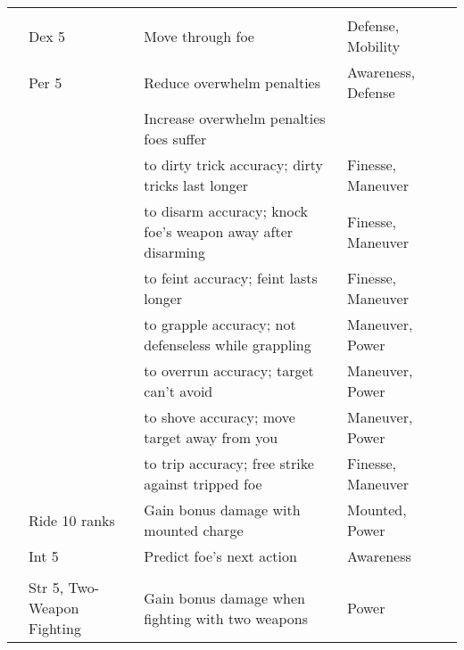 \begin{longtabuwrapper}
\begin{longtabu}{>{\lcol}p{10em} >{\lcol}p{15em} >{\lcol}X >{\lcol}p{6em} >{\lcol}p{3em}}
        \midrule
         &  &  &  &  \\
         & Dex 5 & Move through foe & Defense, Mobility &  \\
         & Per 5 & Reduce overwhelm penalties & Awareness, Defense &  \\
         & \x & Increase overwhelm penalties foes suffer & \x &  \\
         & \x &  to dirty trick accuracy; dirty tricks last longer & Finesse, Maneuver &  \\
         & \x &  to disarm accuracy; knock foe's weapon away after disarming & Finesse, Maneuver &  \\
         & \x &  to feint accuracy; feint lasts longer & Finesse, Maneuver &  \\
         & \x &  to grapple accuracy; not defenseless while grappling & Maneuver, Power &  \\
         & \x &  to overrun accuracy; target can't avoid & Maneuver, Power &  \\
         & \x &  to shove accuracy; move target away from you & Maneuver, Power &  \\
         & \x &  to trip accuracy; free strike against tripped foe & Finesse, Maneuver &  \\
         & Ride 10 ranks & Gain bonus damage with mounted charge & Mounted, Power &  \\
         & Int 5 & Predict foe's next action & Awareness &  \\

        \midrule
         &  &  &  &  \\
         & Str 5, Two-Weapon Fighting & Gain bonus damage when fighting with two weapons & Power &  \\


\end{longtabu}
\end{longtabuwrapper}
